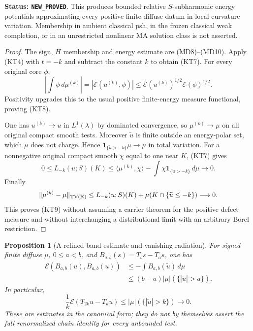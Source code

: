 \documentclass[11pt,a4paper]{article}
\numberwithin{equation}{section}
\newtheorem{proposition}[theorem]{Proposition}
\theoremstyle{definition}
\theoremstyle{remark}
\begin{document}
\noindent\textbf{Status: \texttt{NEW\_PROVED}}.  This produces
bounded relative $S$-subharmonic energy potentials approximating
every positive finite diffuse datum in local curvature variation.
Membership in ambient classical psh, in the frozen classical
weak completion, or in an unrestricted nonlinear MA solution
class is not asserted.

\begin{proof}
The sign, $H$ membership and energy estimate are (MD8)--(MD10).
Apply (KT4) with $t=-k$ and subtract the constant $k$ to obtain
(KT7).  For every original core $\phi$,
\[
 \left|\int\phi\,d\mu^{(k)}\right|
     =|\mathcal E(u^{(k)},\phi)|
                   \le\mathcal E(u^{(k)})^{1/2}\mathcal E(\phi)^{1/2}.
\]
Positivity upgrades this to the usual positive finite-energy
measure functional, proving (KT8).

One has $u^{(k)}\to u$ in $L^1(\lambda)$ by dominated
convergence, so $\mu^{(k)}\to\mu$ on all original compact
smooth tests.  Moreover $\widetilde u$ is finite outside an
energy-polar set, which $\mu$ does not charge.  Hence
$\mathbf1_{\{\widetilde u>-k\}}\mu\to\mu$ in total variation.
For a nonnegative original compact smooth $\chi$ equal to one
near $K$, (KT7) gives
\[
 0\le L_{-k}(u;S)(K)
 \le\langle\mu^{(k)},\chi\rangle
           -\int\chi\mathbf1_{\{\widetilde u>-k\}}\,d\mu
                                                   \longrightarrow0.
\]
Finally
\[
 \|\mu^{(k)}-\mu\|_{\rm TV(K)}
 \le L_{-k}(u;S)(K)+\mu(K\cap\{\widetilde u\le-k\})
                                                   \longrightarrow0.
\]
This proves (KT9) without assuming a carrier theorem for the
positive defect measure and without interchanging a distributional
limit with an arbitrary Borel restriction.
\end{proof}

\begin{proposition}[A refined band estimate and vanishing radiation]
\label{prop:r11-diffuse-band-radiation}
For signed finite diffuse $\mu$, $0\le a<b$, and
$B_{a,b}(s)=T_b s-T_a s$, one has
\[
 \begin{split}
 \mathcal E(B_{a,b}(u),B_{a,b}(u))
       &\le -\int B_{a,b}(\widetilde u)\,d\mu\\
       &\le(b-a)|\mu|(\{|\widetilde u|>a\}).
 \end{split}
 \tag{KT10}
\]
In particular,
\[
       \frac{1}{k}\mathcal E(T_{2k}u-T_ku)
          \le|\mu|(\{|\widetilde u|>k\})\longrightarrow0.
 \tag{KT11}
\]
These are estimates in the canonical form; they do not by themselves
assert the full renormalized chain identity for every unbounded test.
\end{proposition}
\end{document}
